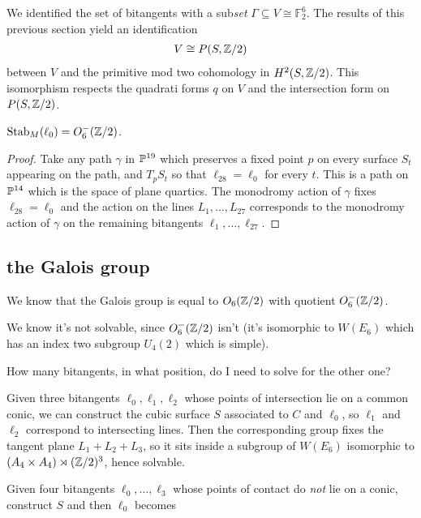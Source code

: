 \documentclass[11pt]{amsart}
\begin{document}
We identified the set of bitangents with a sub\textit{set} $\Gamma \subseteq V \cong \mathbb{F}_2^6$. The results of this previous section yield an identification
\begin{align*}
    V\cong P(S, \Z/2)
\end{align*}
between $V$ and the primitive mod two cohomology in $H^2(S,\Z/2)$. This isomorphism respects the quadrati forms $q$ on $V$ and the intersection form on $P(S,\Z/2)$.

\begin{lemma}  $\Stab_M(\ell_0) = O_6^-(\Z/2)$.
\end{lemma}
\begin{proof}  Take any path $\gamma$ in $\P^{19}$ which preserves a fixed point $p$ on every surface $S_t$ appearing on the path, and $T_p S_t$ so that $\ell_{28} = \ell_0$ for every $t$. This is a path on $\P^{14}$ which is the space of plane quartics. The monodromy action of $\gamma$ fixes $\ell_{28}=\ell_0$ and the action on the lines $L_1, \ldots, L_{27}$ corresponds to the monodromy action of $\gamma$ on the remaining bitangents $\ell_{1}, \ldots, \ell_{27}$.
\end{proof}

\subsection{the Galois group}

We know that the Galois group is equal to $O_6(\Z/2)$ with quotient $O_6^-(\Z/2)$.

We know it's not solvable, since $O_6^-(\Z/2)$ isn't (it's isomorphic to $W(E_6)$ which has an index two subgroup $U_4(2)$ which is simple).

\begin{question} How many bitangents, in what position, do I need to solve for the other one?
\end{question}


Given three bitangents $\ell_0, \ell_1, \ell_2$ whose points of intersection lie on a common conic, we can construct the cubic surface $S$ associated to $C$ and $\ell_0$, so $\ell_1$ and $\ell_2$ correspond to intersecting lines. Then the corresponding group fixes the tangent plane $L_1 + L_2 + L_3$, so it sits inside a subgroup of $W(E_6)$ isomorphic to $(A_4 \times A_4) \rtimes (\Z/2)^3$, hence solvable.

Given four bitangents $\ell_0, \ldots, \ell_3$ whose points of contact do \textit{not} lie on a conic, construct $S$ and then $\ell_0$ becomes 
\end{document}
